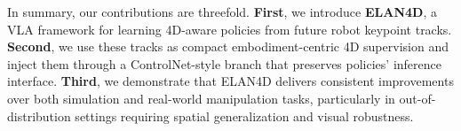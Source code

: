 In summary, our contributions are threefold. \textbf{First}, we introduce \textbf{ELAN4D}, a VLA framework for learning 4D-aware policies from future robot keypoint tracks. \textbf{Second}, we use these tracks as compact embodiment-centric 4D supervision and inject them through a ControlNet-style branch that preserves policies' inference interface. \textbf{Third}, we demonstrate that ELAN4D delivers consistent improvements over both simulation and real-world manipulation tasks, particularly in out-of-distribution settings requiring spatial generalization and visual robustness.

